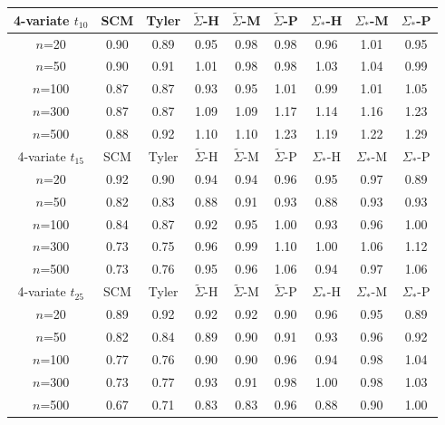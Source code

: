 \begin{table}[t]
\begin{scriptsize}
\begin{tabular}{c|cc|ccc|ccc}
    4-variate $t_{10}$ & SCM  & Tyler & $\tilde{\Sigma}$-H & $\tilde{\Sigma}$-M & $\tilde{\Sigma}$-P & ${\Sigma}_{*}$-H & ${\Sigma}_{*}$-M & ${\Sigma}_{*}$-P \\ \hline
    $n$=20             & 0.90 & 0.89  & 0.95   & 0.98   & 0.98  & 0.96    & 1.01    & 0.95   \\
    $n$=50             & 0.90 & 0.91  & 1.01   & 0.98   & 0.98  & 1.03    & 1.04    & 0.99   \\
    $n$=100            & 0.87 & 0.87  & 0.93   & 0.95   & 1.01  & 0.99    & 1.01    & 1.05   \\
    $n$=300            & 0.87 & 0.87  & 1.09   & 1.09   & 1.17  & 1.14    & 1.16    & 1.23   \\
    $n$=500            & 0.88 & 0.92  & 1.10   & 1.10   & 1.23  & 1.19    & 1.22    & 1.29   \\ \hline
    4-variate $t_{15}$  & SCM  & Tyler & $\tilde{\Sigma}$-H & $\tilde{\Sigma}$-M & $\tilde{\Sigma}$-P & ${\Sigma}_{*}$-H & ${\Sigma}_{*}$-M & ${\Sigma}_{*}$-P \\ \hline
    $n$=20             & 0.92 & 0.90  & 0.94   & 0.94   & 0.96  & 0.95    & 0.97    & 0.89   \\
    $n$=50             & 0.82 & 0.83  & 0.88   & 0.91   & 0.93  & 0.88    & 0.93    & 0.93   \\
    $n$=100            & 0.84 & 0.87  & 0.92   & 0.95   & 1.00  & 0.93    & 0.96    & 1.00   \\
    $n$=300            & 0.73 & 0.75  & 0.96   & 0.99   & 1.10  & 1.00    & 1.06    & 1.12   \\
    $n$=500            & 0.73 & 0.76  & 0.95   & 0.96   & 1.06  & 0.94    & 0.97    & 1.06   \\ \hline
    4-variate $t_{25}$  & SCM  & Tyler & $\tilde{\Sigma}$-H & $\tilde{\Sigma}$-M & $\tilde{\Sigma}$-P & ${\Sigma}_{*}$-H & ${\Sigma}_{*}$-M & ${\Sigma}_{*}$-P \\ \hline
    $n$=20             & 0.89 & 0.92  & 0.92   & 0.92   & 0.90  & 0.96    & 0.95    & 0.89   \\
    $n$=50             & 0.82 & 0.84  & 0.89   & 0.90   & 0.91  & 0.93    & 0.96    & 0.92   \\
    $n$=100            & 0.77 & 0.76  & 0.90   & 0.90   & 0.96  & 0.94    & 0.98    & 1.04   \\
    $n$=300            & 0.73 & 0.77  & 0.93   & 0.91   & 0.98  & 1.00    & 0.98    & 1.03   \\
    $n$=500            & 0.67 & 0.71  & 0.83   & 0.83   & 0.96  & 0.88    & 0.90    & 1.00   \\ \hline

\end{tabular}
\end{scriptsize}
\end{table}
